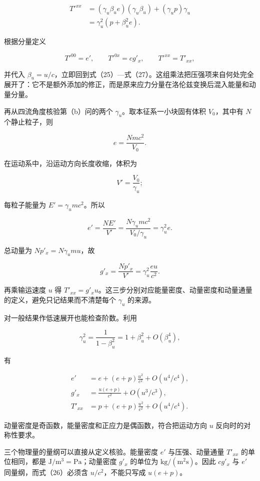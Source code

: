 \documentclass[12pt,a4paper,UTF8]{ctexart}
\begin{document}
\[
\begin{aligned}
T'^{xx}
&=(\gamma_u\beta_u e)(\gamma_u\beta_u)
+(\gamma_u p)\gamma_u\\
&=\gamma_u^2(p+\beta_u^2e).
\end{aligned} \tag{38}
\]

根据分量定义

\[
T'^{00}=e',
\qquad
T'^{0x}=cg'_x,
\qquad
T'^{xx}=T'_{xx}, \tag{39}
\]

并代入
\(\beta_u=u/c\)，立即回到式（25）---式（27）。这组乘法把压强项来自何处完全展开了：它不是额外添加的修正，而是原来应力分量在洛伦兹变换后混入能量和动量分量。

再从四流角度核验第（b）问的两个 \(\gamma_u\)。取本征系一小块固有体积
\(V_0\)，其中有 \(N\) 个静止粒子，则

\[
e=\frac{Nmc^2}{V_0}. \tag{40}
\]

在运动系中，沿运动方向长度收缩，体积为

\[
V'=\frac{V_0}{\gamma_u}; \tag{41}
\]

每粒子能量为 \(E'=\gamma_umc^2\)。所以

\[
e'=\frac{NE'}{V'}
=\frac{N\gamma_umc^2}{V_0/\gamma_u}
=\gamma_u^2e. \tag{42}
\]

总动量为 \(Np'_x=N\gamma_umu\)，故

\[
g'_x=\frac{Np'_x}{V'}
=\gamma_u^2\frac{eu}{c^2}. \tag{43}
\]

再乘输运速度 \(u\) 得
\(T'_{xx}=g'_xu\)。这三步分别对应能量密度、动量密度和动量通量的定义，避免只记结果而不清楚每个
\(\gamma_u\) 的来源。

对一般结果作低速展开也能检查阶数。利用

\[
\gamma_u^2=\frac1{1-\beta_u^2}
=1+\beta_u^2+O(\beta_u^4), \tag{44}
\]

有

\[
\begin{aligned}
e'&=e+(e+p)\frac{u^2}{c^2}+O(u^4/c^4),\\
g'_x&=\frac{u(e+p)}{c^2}+O(u^3/c^3),\\
T'_{xx}&=p+(e+p)\frac{u^2}{c^2}+O(u^4/c^4).
\end{aligned} \tag{45}
\]

动量密度是奇函数，能量密度和正应力是偶函数，符合把运动方向 \(u\)
反向时的对称性要求。

三个物理量的量纲可以直接从定义核验。能量密度 \(e'\) 与压强、动量通量
\(T'_{xx}\) 的单位相同，都是 \(\mathrm{J/m^3}=\mathrm{Pa}\)；动量密度
\(g'_x\) 的单位为 \(\mathrm{kg/(m^2s)}\)。因此 \(cg'_x\) 与 \(e'\)
同量纲，而式（26）必须含 \(u/c^2\)，不能只写成 \(u(e+p)\)。
\end{document}
